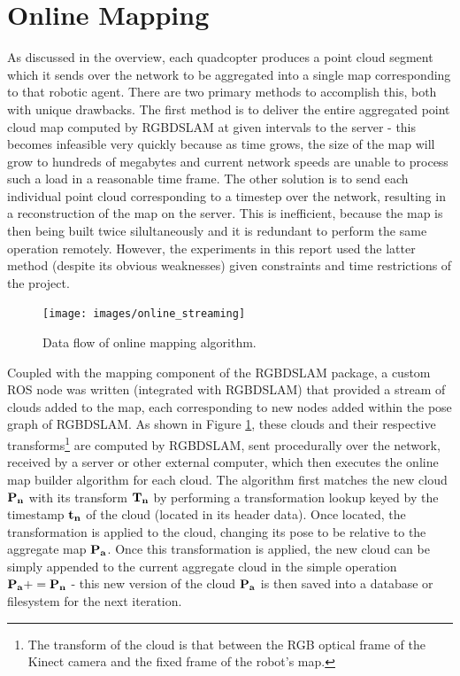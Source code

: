 \documentclass[letterpaper, oneside, 10pt]{report}
\begin{document}
\section{Online Mapping}
As discussed in the overview, each quadcopter produces a point cloud segment which it sends over the network to be aggregated into a single map corresponding to that robotic agent. There are two primary methods to accomplish this, both with unique drawbacks. The first method is to deliver the entire aggregated point cloud map computed by RGBDSLAM at given intervals to the server - this becomes infeasible very quickly because as time grows, the size of the map will grow to hundreds of megabytes and current network speeds are unable to process such a load in a reasonable time frame. The other solution is to send each individual point cloud corresponding to a timestep over the network, resulting in a reconstruction of the map on the server. This is inefficient, because the map is then being built twice silultaneously and it is redundant to perform the same operation remotely. However, the experiments in this report used the latter method (despite its obvious weaknesses) given constraints and time restrictions of the project.

\begin{figure}[h!]
 \caption{Data flow of online mapping algorithm.}
 \centering
   \texttt{[image: images/online\_streaming]}
 \label{fig: online stream.}
\end{figure}

Coupled with the mapping component of the RGBDSLAM package, a custom ROS node was written (integrated with RGBDSLAM) that provided a stream of clouds added to the map, each corresponding to new nodes added within the pose graph of RGBDSLAM. As shown in Figure \ref{fig: online stream.}, these clouds and their respective transforms\footnote{The transform of the cloud is that between the RGB optical frame of the Kinect camera and the fixed frame of the robot's map.} are computed by RGBDSLAM, sent procedurally over the network, received by a server or other external computer, which then executes the online map builder algorithm for each cloud. The algorithm first matches the new cloud $\bf{P_n}$ with its transform $\bf{T_n}$ by performing a transformation lookup keyed by the timestamp $\bf{t_n}$ of the cloud (located in its header data). Once located, the transformation is applied to the cloud, changing its pose to be relative to the aggregate map $\bf{P_a}$. Once this transformation is applied, the new cloud can be simply appended to the current aggregate cloud in the simple operation $\bf{P_a} += \bf{P_n}$  - this new version of the cloud $\bf{P_a}$ is then saved into a database or filesystem for the next iteration.
\end{document}
